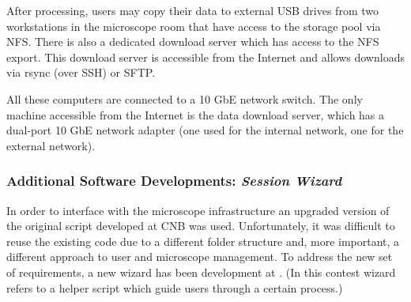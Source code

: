 


After processing, users may  copy their data to external USB drives from two workstations in the microscope room that have access to the storage pool via NFS.
There is also a dedicated download server which has access to the NFS export. This download server is accessible from  the Internet and allows downloads via rsync (over SSH) or SFTP. 

All these computers are connected to a 10 GbE network switch. The only machine accessible from the Internet is the data download server, which has a dual-port 10 GbE network adapter (one used for the internal network, one for the external network). %

\subsubsection{Additional Software Developments: \emph{Session Wizard}}
In order to interface \scipion with the microscope infrastructure an upgraded version of the original script developed at CNB was used. Unfortunately, it was difficult to reuse the existing code due to a different folder structure and, more important, a different approach to user and microscope management. To address the new set of requirements, a new wizard has been development at \scilifelab. (In this contest wizard refers to a helper script which guide users through a certain process.) %

